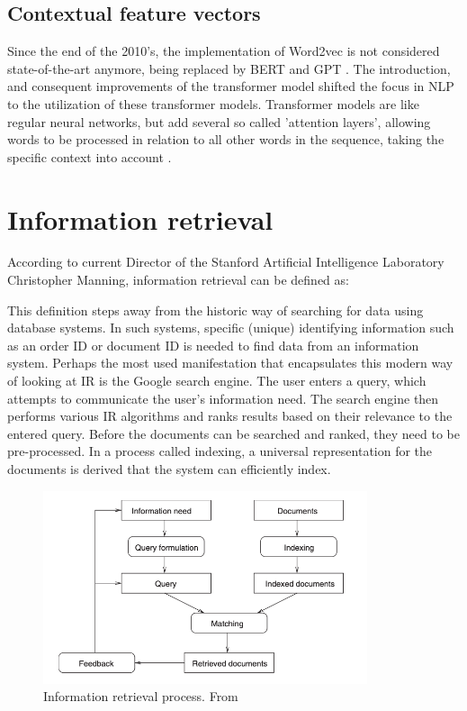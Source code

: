 \documentclass[twoside]{uva-inf-bachelor-thesis}
\begin{document}
\subsection{Contextual feature vectors}

Since the end of the 2010's, the implementation of Word2vec is not considered state-of-the-art anymore, being replaced by BERT \cite{devlin19} and GPT \cite{brown20}. The introduction, and consequent improvements of the transformer model shifted the focus in NLP to the utilization of these transformer models. Transformer models are like regular neural networks, but add several so called 'attention layers', allowing words to be processed in relation to all other words in the sequence, taking the specific context into account \cite{vaswani17, vondermosel22}.

\section{Information retrieval} \label{retrievalSection}
According to current Director of the Stanford Artificial Intelligence Laboratory Christopher Manning, information retrieval can be defined as: 

\cite{manning08IR}

This definition steps away from the historic way of searching for data using database systems. In such systems, specific (unique) identifying information such as an order ID or document ID is needed to find data from an information system. Perhaps the most used manifestation that encapsulates this modern way of looking at IR is the Google search engine. The user enters a query, which attempts to communicate the user's information need. The search engine then performs various IR algorithms and ranks results based on their relevance to the entered query. Before the documents can be searched and ranked, they need to be pre-processed. In a process called indexing, a universal representation for the documents is derived that the system can efficiently index.

\begin{figure}[h]
    \centering
    \includegraphics[width=0.85\textwidth]{images/irDiagram.png}
    \caption{Information retrieval process. From \cite{goker2009information}}
    \label{fig:ir}
\end{figure}
\end{document}
